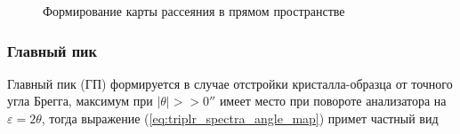 \begin{figure}[H]
  \centering
  \hfill
  \hfill
  \caption{Формирование карты рассеяния в прямом пространстве}
  \label{ris:triple_map_piks}
\end{figure}


\subsubsection*{Главный пик}
Главный пик (ГП) формируется в случае отстройки кристалла-образца от точного угла Брегга,
максимум при $|\theta|>>0''$ имеет место при повороте анализатора на $\varepsilon = 2\theta$,
тогда выражение (\ref{eq:triplr_spectra_angle_map}) примет частный вид

